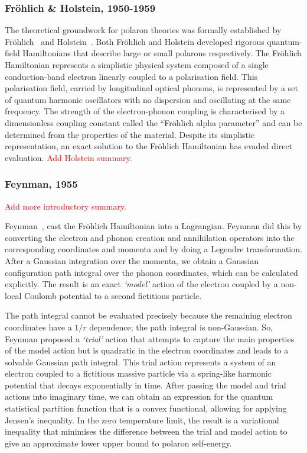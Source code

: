 \subsubsection{Fr\"ohlich \& Holstein, 1950-1959}
\label{subsubsec:2-1-1-2}

The theoretical groundwork for polaron theories was formally established by Fr\"ohlich~\cite{frohlich_electrons_1954} and Holstein~\cite{holstein_studies_1959-1, holstein_studies_1959}. Both Fr\"ohlich and Holstein developed rigorous quantum-field Hamiltonians that describe large or small polarons respectively. The Fr\"ohlich Hamiltonian represents a simplistic physical system composed of a single conduction-band electron linearly coupled to a polarisation field. This polarisation field, carried by longitudinal optical phonons, is represented by a set of quantum harmonic oscillators with no dispersion and oscillating at the same frequency. The strength of the electron-phonon coupling is characterised by a dimensionless coupling constant called the ``Fr\"ohlich alpha parameter'' and can be determined from the properties of the material. Despite its simplistic representation, an exact solution to the Fr\"ohlich Hamiltonian has evaded direct evaluation. \textcolor{red}{Add Holstein summary.}

\subsubsection{Feynman, 1955}
\label{subsubsec:2-1-1-3}

\textcolor{red}{Add more introductory summary.}

Feynman~\cite{feynman_slow_1955}, cast the Fr\"ohlich Hamiltonian into a Lagrangian. Feynman did this by converting the electron and phonon creation and annihilation operators into the corresponding coordinates and momenta and by doing a Legendre transformation. After a Gaussian integration over the momenta, we obtain a Gaussian configuration path integral over the phonon coordinates, which can be calculated explicitly. The result is an exact \emph{`model'} action of the electron coupled by a non-local Coulomb potential to a second fictitious particle. 

The path integral cannot be evaluated precisely because the remaining electron coordinates have a $1 / r$ dependence; the path integral is non-Gaussian. So, Feynman proposed a \emph{`trial'} action that attempts to capture the main properties of the model action but is quadratic in the electron coordinates and leads to a solvable Gaussian path integral. This trial action represents a system of an electron coupled to a fictitious massive particle via a spring-like harmonic potential that decays exponentially in time. After passing the model and trial actions into imaginary time, we can obtain an expression for the quantum statistical partition function that is a convex functional, allowing for applying Jensen's inequality. In the zero temperature limit, the result is a variational inequality that minimises the difference between the trial and model action to give an approximate lower upper bound to polaron self-energy.

